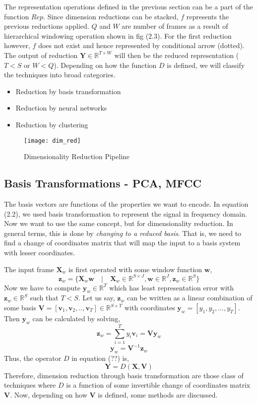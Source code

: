 \noindent The representation operations defined in the previous section can be a part of the function $Rep$. Since dimension reductions can be stacked, $f$ represents the previous reductions applied. $Q$ and $W$ are number of frames as a result of hierarchical windowing operation shown in fig (2.3). For the first reduction however, $f$ does not exist and hence represented by conditional arrow (dotted). The output of reduction $\textbf{Y} \in \mathbb{R}^{T \times W}$ will then be the reduced representation ($T < S$ or $W < Q$). Depending on how the function $D$ is defined, we will classify the techniques into broad categories.
\begin{itemize}
  \item Reduction by \gls{basis} transformation
  \item Reduction by neural networks
  \item Reduction by clustering 
\end{itemize} 
\begin{figure}[h] 
\centering
\texttt{[image: dim\_red]}
\caption{Dimensionality Reduction Pipeline}
 \label{fig:Dimensionality Reduction}
 \end{figure}
\FloatBarrier
\bigskip

\subsection{Basis Transformations - PCA, MFCC}
\label{basis}

The \gls{basis} vectors are functions of the properties we want to encode. In equation (2.2), we used \gls{basis transformation} to represent the signal in frequency domain. Now we want to use the same concept, but for dimensionality reduction. In general terms, this is done by \textit{changing to a reduced basis}. That is, we need to find a   \gls{change of coordinates matrix} that will map the input to a basis system with lesser coordinates. 
\bigskip

\noindent The input frame $\textbf{X}_{w}$ is first operated with some window function $\textbf{w}$,
\[
  \textbf{z}_{w} = \{\textbf{X}_{w}\textbf{w} \quad | \quad \textbf{X}_{w} \in \mathbb{R}^{S \times J}, \textbf{w} \in \mathbb{R}^{J}, \textbf{z}_{w} \in \mathbb{R}^{S}\}
\]    
Now we have to compute $\textbf{y}_{w} \in \mathbb{R}^{T}$ which has least representation error with $\textbf{z}_{w} \in \mathbb{R}^{S}$ such that $T < S$. Let us say, $\textbf{z}_{w}$ can be written as a \gls{linear combination} of some \gls{basis} $\textbf{V} = [\textbf{v}_{1}, \textbf{v}_{2}, ..,\textbf{v}_{T}] \in \mathbb{R}^{S \times T}$ with coordinates $\textbf{y}_{w} = [y_{1}, y_{2},...,y_{T}]$. Then $\textbf{y}_{w}$ can be calculated by solving,
\[
\textbf{z}_{w} = \displaystyle\sum_{i=1}^{T}y_{i}\textbf{v}_{i} = \textbf{V}\textbf{y}_{w}
\]
\[
\textbf{y}_{w} = \textbf{V}^{-1}\textbf{z}_{w}
\]
Thus, the operator $D$ in equation (??) is,
\[
\textbf{Y} = D(\textbf{X}, \textbf{V})
\]
Therefore, dimension reduction through \gls{basis transformation} are those class of techniques where $D$ is a function of some invertible \gls{change of coordinates matrix} $\textbf{V}$. Now, depending on how $\textbf{V}$ is defined, some methods are discussed.

